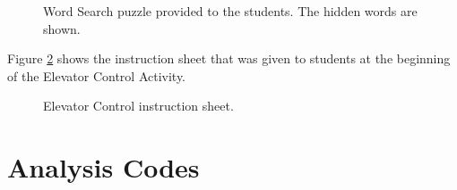 	\begin{figure}%
   	\centering
   	\caption[Word Search puzzle.]{Word Search puzzle provided to the students. The hidden words are shown.}
   	\label{fig:wordsearch-puzzle}
	\end{figure}
	



	\label{sec:elevator_handout}
	Figure \ref{fig:elevator-instructions} shows the instruction sheet that was given to students at the beginning of the Elevator Control Activity.
	
	\begin{figure}%
   	\centering
   	\caption{Elevator Control instruction sheet.}
   	\label{fig:elevator-instructions}
	\end{figure}

\chapter{Analysis Codes}

